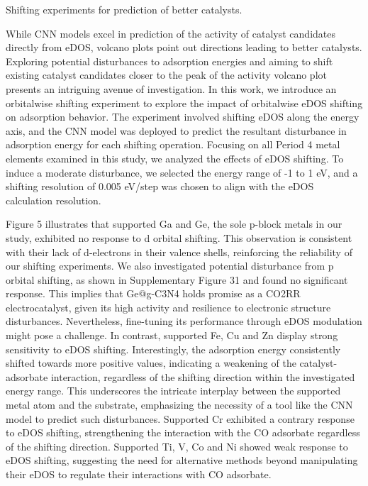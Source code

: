 Shifting experiments for prediction of better catalysts.

While CNN models excel in prediction of the activity of catalyst candidates directly from eDOS, volcano plots point out directions leading to better catalysts. Exploring potential disturbances to adsorption energies and aiming to shift existing catalyst candidates closer to the peak of the activity volcano plot presents an intriguing avenue of investigation. In this work, we introduce an orbitalwise shifting experiment to explore the impact of orbitalwise eDOS shifting on adsorption behavior. The experiment involved shifting eDOS along the energy axis, and the CNN model was deployed to predict the resultant disturbance in adsorption energy for each shifting operation. Focusing on all Period 4 metal elements examined in this study, we analyzed the effects of eDOS shifting. To induce a moderate disturbance, we selected the energy range of -1 to 1 eV, and a shifting resolution of 0.005 eV/step was chosen to align with the eDOS calculation resolution.

Figure 5 illustrates that supported Ga and Ge, the sole p-block metals in our study, exhibited no response to d orbital shifting. This observation is consistent with their lack of d-electrons in their valence shells, reinforcing the reliability of our shifting experiments. We also investigated potential disturbance from p orbital shifting, as shown in Supplementary Figure 31 and found no significant response. This implies that Ge@g-C3N4 holds promise as a CO2RR electrocatalyst, given its high activity and resilience to electronic structure disturbances. Nevertheless, fine-tuning its performance through eDOS modulation might pose a challenge. In contrast, supported Fe, Cu and Zn display strong sensitivity to eDOS shifting. Interestingly, the adsorption energy consistently shifted towards more positive values, indicating a weakening of the catalyst-adsorbate interaction, regardless of the shifting direction within the investigated energy range. This underscores the intricate interplay between the supported metal atom and the substrate, emphasizing the necessity of a tool like the CNN model to predict such disturbances. Supported Cr exhibited a contrary response to eDOS shifting, strengthening the interaction with the CO adsorbate regardless of the shifting direction. Supported Ti, V, Co and Ni showed weak response to eDOS shifting, suggesting the need for alternative methods beyond manipulating their eDOS to regulate their interactions with CO adsorbate.

